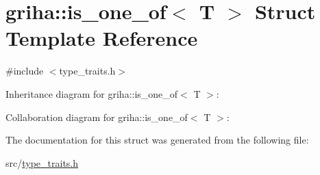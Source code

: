 \hypertarget{structgriha_1_1is__one__of_3_01_t_01_4}{}\section{griha\+:\+:is\+\_\+one\+\_\+of$<$ T $>$ Struct Template Reference}
\label{structgriha_1_1is__one__of_3_01_t_01_4}


{\ttfamily \#include $<$type\+\_\+traits.\+h$>$}



Inheritance diagram for griha\+:\+:is\+\_\+one\+\_\+of$<$ T $>$\+:


Collaboration diagram for griha\+:\+:is\+\_\+one\+\_\+of$<$ T $>$\+:


The documentation for this struct was generated from the following file\+:\begin{DoxyCompactItemize}
\item 
src/\hyperlink{type__traits_8h}{type\+\_\+traits.\+h}\end{DoxyCompactItemize}
